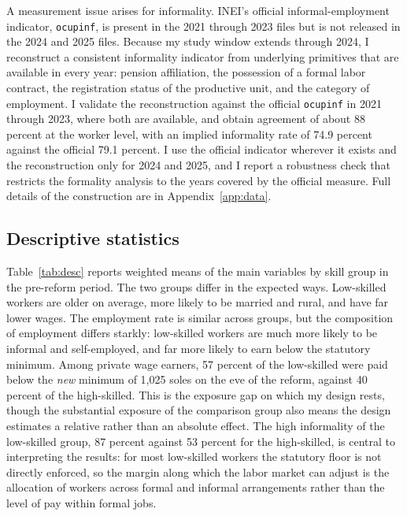 A measurement issue arises for informality. INEI's official informal-employment indicator, \texttt{ocupinf}, is present in the 2021 through 2023 files but is not released in the 2024 and 2025 files. Because my study window extends through 2024, I reconstruct a consistent informality indicator from underlying primitives that are available in every year: pension affiliation, the possession of a formal labor contract, the registration status of the productive unit, and the category of employment. I validate the reconstruction against the official \texttt{ocupinf} in 2021 through 2023, where both are available, and obtain agreement of about 88 percent at the worker level, with an implied informality rate of 74.9 percent against the official 79.1 percent. I use the official indicator wherever it exists and the reconstruction only for 2024 and 2025, and I report a robustness check that restricts the formality analysis to the years covered by the official measure. Full details of the construction are in Appendix~\ref{app:data}.

\subsection{Descriptive statistics}

Table~\ref{tab:desc} reports weighted means of the main variables by skill group in the pre-reform period. The two groups differ in the expected ways. Low-skilled workers are older on average, more likely to be married and rural, and have far lower wages. The employment rate is similar across groups, but the composition of employment differs starkly: low-skilled workers are much more likely to be informal and self-employed, and far more likely to earn below the statutory minimum. Among private wage earners, 57 percent of the low-skilled were paid below the \emph{new} minimum of 1,025 soles on the eve of the reform, against 40 percent of the high-skilled. This is the exposure gap on which my design rests, though the substantial exposure of the comparison group also means the design estimates a relative rather than an absolute effect. The high informality of the low-skilled group, 87 percent against 53 percent for the high-skilled, is central to interpreting the results: for most low-skilled workers the statutory floor is not directly enforced, so the margin along which the labor market can adjust is the allocation of workers across formal and informal arrangements rather than the level of pay within formal jobs.




